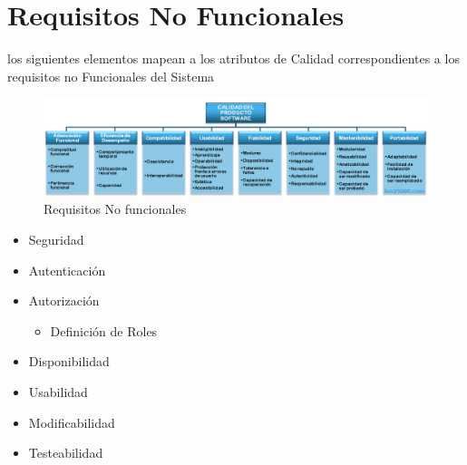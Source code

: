 \chapter{Requisitos No Funcionales}


los siguientes elementos mapean a los atributos de Calidad correspondientes a los requisitos no Funcionales del Sistema

\begin{figure}[h]
\begin{center}
  \includegraphics[width=\textwidth]{aux/nofun}
  \caption{Requisitos No funcionales}
  \label{figCasosUso}
\end{center}
\end{figure}

\begin{itemize}
	\item Seguridad
	\item Autenticación
	\item Autorización
		\begin{itemize}
			\item Definición de Roles
		\end{itemize}
	\item Disponibilidad
	\item Usabilidad
	\item Modificabilidad
	\item Testeabilidad
\end{itemize}